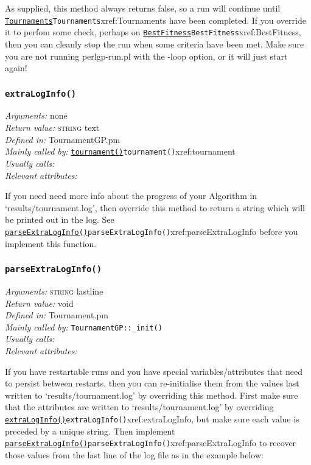 \documentclass[a4paper]{article}
\begin{document}
As supplied, this method always returns false, so a run will continue
until \hyperref[no]{\texttt{Tournaments}}{\texttt{Tournaments}}{xref:Tournaments} have been completed.  If you override it to
perfom some check, perhaps on \hyperref[no]{\texttt{BestFitness}}{\texttt{BestFitness}}{xref:BestFitness}, then you can
cleanly stop the run when some criteria have been met.  Make sure you
are not running perlgp-run.pl with the -loop option, or it will just
start again!

\subsubsection{\texttt{extraLogInfo()}}\label{xref:extraLogInfo}
\begin{flushleft}
\textit{Arguments:} none\\
\textit{Return value:} \textsc{string} text\\
\textit{Defined in:} TournamentGP.pm\\
\textit{Mainly called by:} \hyperref[no]{\texttt{tournament()}}{\texttt{tournament()}}{xref:tournament}\\
\textit{Usually calls:} \\
\textit{Relevant attributes:}
\end{flushleft}

If you need need more info about the progress of your Algorithm in
`results/tournament.log', then override this method to return a string
which will be printed out in the log.  See
\hyperref[no]{\texttt{parseExtraLogInfo()}}{\texttt{parseExtraLogInfo()}}{xref:parseExtraLogInfo} before you implement this function.

\subsubsection{\texttt{parseExtraLogInfo()}}\label{xref:parseExtraLogInfo}
\begin{flushleft}
\textit{Arguments:} \textsc{string} lastline\\
\textit{Return value:} void\\
\textit{Defined in:} Tournament.pm\\
\textit{Mainly called by:} \texttt{TournamentGP::\_init()}\\
\textit{Usually calls:} \\
\textit{Relevant attributes:}
\end{flushleft}

If you have restartable runs and you have special variables/attributes
that need to persist between restarts, then you can re-initialise them
from the values last written to `results/tournament.log' by overriding
this method.  First make sure that the attributes are written to
`results/tournament.log' by overriding \hyperref[no]{\texttt{extraLogInfo()}}{\texttt{extraLogInfo()}}{xref:extraLogInfo}, but
make sure each value is preceded by a unique string.  Then implement
\hyperref[no]{\texttt{parseExtraLogInfo()}}{\texttt{parseExtraLogInfo()}}{xref:parseExtraLogInfo} to recover those values from the last
line of the log file as in the example below:
\end{document}
